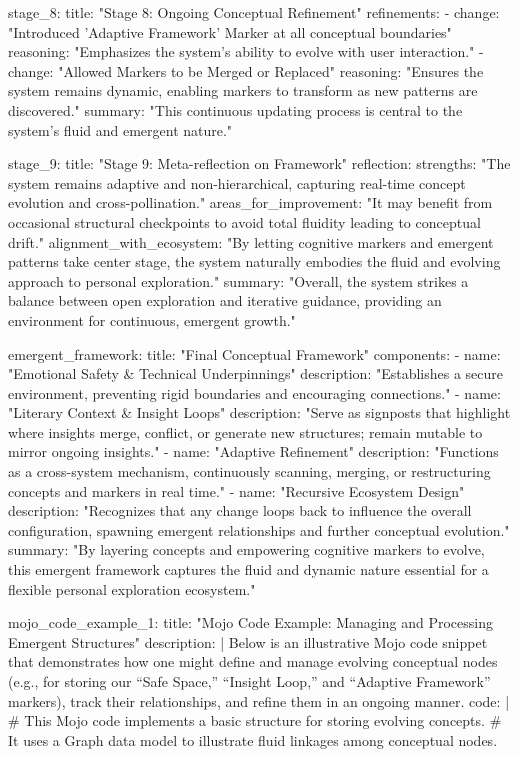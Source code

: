   stage_8:
    title: "Stage 8: Ongoing Conceptual Refinement"
    refinements:
      - change: "Introduced 'Adaptive Framework' Marker at all conceptual boundaries"
        reasoning: "Emphasizes the system's ability to evolve with user interaction."
      - change: "Allowed Markers to be Merged or Replaced"
        reasoning: "Ensures the system remains dynamic, enabling markers to transform as new patterns are discovered."
    summary: "This continuous updating process is central to the system's fluid and emergent nature."

  stage_9:
    title: "Stage 9: Meta-reflection on Framework"
    reflection:
      strengths: "The system remains adaptive and non-hierarchical, capturing real-time concept evolution and cross-pollination."
      areas_for_improvement: "It may benefit from occasional structural checkpoints to avoid total fluidity leading to conceptual drift."
      alignment_with_ecosystem: "By letting cognitive markers and emergent patterns take center stage, the system naturally embodies the fluid and evolving approach to personal exploration."
    summary: "Overall, the system strikes a balance between open exploration and iterative guidance, providing an environment for continuous, emergent growth."

emergent_framework:
  title: "Final Conceptual Framework"
  components:
    - name: "Emotional Safety & Technical Underpinnings"
      description: "Establishes a secure environment, preventing rigid boundaries and encouraging connections."
    - name: "Literary Context & Insight Loops"
      description: "Serve as signposts that highlight where insights merge, conflict, or generate new structures; remain mutable to mirror ongoing insights."
    - name: "Adaptive Refinement"
      description: "Functions as a cross-system mechanism, continuously scanning, merging, or restructuring concepts and markers in real time."
    - name: "Recursive Ecosystem Design"
      description: "Recognizes that any change loops back to influence the overall configuration, spawning emergent relationships and further conceptual evolution."
  summary: "By layering concepts and empowering cognitive markers to evolve, this emergent framework captures the fluid and dynamic nature essential for a flexible personal exploration ecosystem."

mojo_code_example_1:
  title: "Mojo Code Example: Managing and Processing Emergent Structures"
  description: |
    Below is an illustrative Mojo code snippet that demonstrates how one might define and manage evolving conceptual nodes (e.g., for storing our “Safe Space,” “Insight Loop,” and “Adaptive Framework” markers), track their relationships, and refine them in an ongoing manner.
  code: |
    # This Mojo code implements a basic structure for storing evolving concepts.
    # It uses a Graph data model to illustrate fluid linkages among conceptual nodes.

